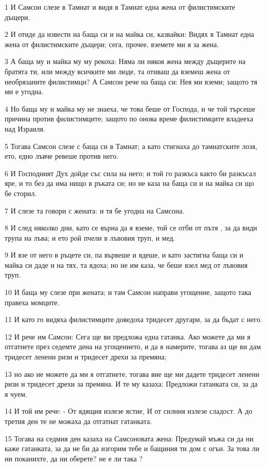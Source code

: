 \par 1 И Самсон слезе в Тамнат и видя в Тамнат една жена от филистимските дъщери.
\par 2 И отиде да извести на баща си и на майка си, казвайки: Видях в Тамнат една жена от филистимските дъщери; сега, прочее, вземете ми я за жена.
\par 3 А баща му и майка му му рекоха: Няма ли някоя жена между дъщерите на братята ти, или между всичките ми люде, та отиваш да вземеш жена от необрязаните филистимци? А Самсон рече на баща си: Нея ми вземи; защото тя ми е угодна.
\par 4 Но баща му и майка му не знаеха, че това беше от Господа, и че той търсеше причина против филистимците; защото по онова време филистимците владееха над Израиля.
\par 5 Тогава Самсон слезе с баща си в Тамнат; а като стигнаха до тамнатските лозя, ето, едно лъвче ревеше против него.
\par 6 И Господният Дух дойде със сила на него; и той го разкъса както би разкъсал яре, и то без да има нищо в ръката си; но не каза на баща си и на майка си що бе сторил.
\par 7 И слезе та говори с жената: и тя бе угодна на Самсона.
\par 8 И след няколко дни, като се върна да я вземе, той се отби от пътя , за да види трупа на лъва; и ето рой пчели в лъвовия труп, и мед.
\par 9 И взе от него в ръцете си, па вървеше и ядеше, и като застигна баща си и майка си даде и на тях, та ядоха; но не им каза, че беше взел мед от лъвовия труп.
\par 10 И баща му слезе при жената; и там Самсон направи угощение, защото така правеха момците.
\par 11 И като го видяха филистимците доведоха тридесет другари, за да бъдат с него.
\par 12 И рече им Самсон: Сега ще ви предложа една гатанка. Ако можете да ми я отгатнете през седемте дена на угощението, и да я намерите, тогава аз ще ви дам тридесет ленени ризи и тридесет дрехи за премяна;
\par 13 но ако не можете да ми я отгатнете, тогава вие ще ми дадете тридесет ленени ризи и тридесет дрехи за премяна. И те му казаха: Предложи гатанката си, за да я чуем.
\par 14 И той им рече: - От ядящия излезе ястие, И от силния излезе сладост. А до третия ден те не можаха да отгатнат гатанката.
\par 15 Тогава на седмия ден казаха на Самсоновата жена: Предумай мъжа си да ни каже гатанката, за да не би да изгорим тебе и бащиния ти дом с огън. За това ли ни поканихте, да ни оберете? не е ли така ?
